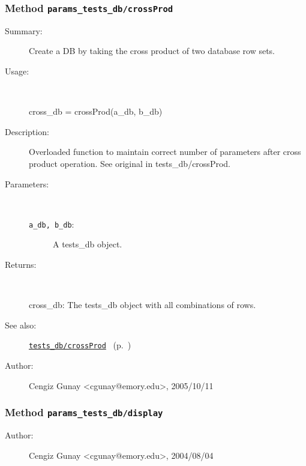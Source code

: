 \subsubsection[Method \texttt{crossProd}]{Method \texttt{params\_tests\_db/crossProd}}%
%
\label{ref_params_tests_db__crossProd}%
\hypertarget{ref_params_tests_db__crossProd}{}%
\begin{description}
\item[Summary:]Create a DB by taking the cross product of two database row sets.
%
\item[Usage:]~%
\begin{lyxcode}%
cross\_db = crossProd(a\_db, b\_db)
%
\end{lyxcode}%
%
\item[Description:]%
Overloaded function to maintain correct number of parameters after
 cross product operation. See original in tests\_db/crossProd.
\item[Parameters:]~
\begin{description}%
\item[\texttt{a\_db, b\_db}:]
 A tests\_db object.
\end{description}%
%
\item[Returns:]~

	cross\_db: The tests\_db object with all combinations of rows.
%
%
\item[See also:]%
\hyperlink{ref_tests_db__crossProd}{\texttt{tests\_db/crossProd}}%
\ (p.~\pageref{ref_tests_db__crossProd})%
%
%
\item[Author:]%
Cengiz Gunay <cgunay@emory.edu>, 2005/10/11%
\end{description}
\methodline%
\subsubsection[Method \texttt{display}]{Method \texttt{params\_tests\_db/display}}%
%
\label{ref_params_tests_db__display}%
\hypertarget{ref_params_tests_db__display}{}%
\begin{description}
%
%
%
%
%
%
%
\item[Author:]%
Cengiz Gunay <cgunay@emory.edu>, 2004/08/04%
\end{description}
\methodline%
